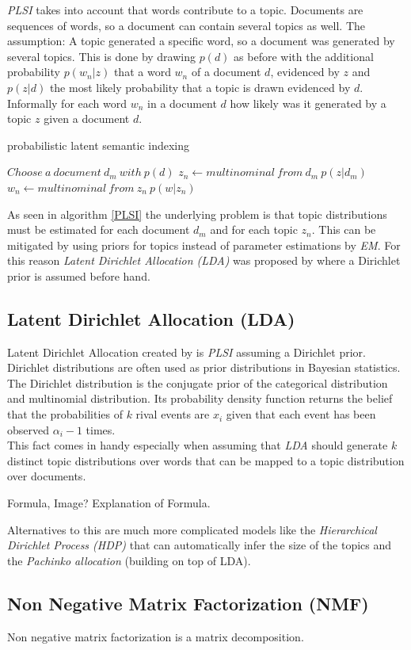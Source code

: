     \emph{PLSI} takes into account that words contribute to a topic. Documents are sequences of words, so a document can contain several topics as well. The assumption: A topic generated a specific word, so a document was generated by several topics. This is done by drawing $p(d)$ as before with the additional probability $p(w_n|z)$ that a word $w_n$ of a document $d$, evidenced by $z$ and $p(z|d)$ the most likely probability that a topic is drawn evidenced by $d$. Informally for each word $w_n$ in a document $d$ how likely was it generated by a topic $z$ given a document $d$.

    \begin{algorithm}[H]
    \begin{algorithmic}[1]
      \caption{probabilistic latent semantic indexing}\label{PLSI}
      \State $Choose\:a\:document\:d_m\:with\:p(d)$
          \State $z_n \gets multinominal\:from\:d_m\:p(z|d_m)$
          \State $w_n \gets multinominal\:from\:z_n\:p(w|z_n)$
        \EndFor
    \end{algorithmic}
    \end{algorithm}

    As seen in algorithm \ref{PLSI} the underlying problem is that topic distributions must be estimated for each document $d_m$ and for each topic $z_n$. This can be mitigated by using priors for topics instead of parameter estimations by \emph{EM}. For this reason \emph{Latent Dirichlet Allocation (LDA)} was proposed by \cite{LDA2003} where a Dirichlet prior is assumed before hand.

  \subsection{Latent Dirichlet Allocation (LDA)}
    Latent Dirichlet Allocation created by \cite{LDA2003} is \emph{PLSI} assuming a Dirichlet prior. Dirichlet distributions are often used as prior distributions in Bayesian statistics. The Dirichlet distribution is the conjugate prior of the categorical distribution and multinomial distribution. Its probability density function returns the belief that the probabilities of $k$ rival events are $x_i$ given that each event has been observed $\alpha_i-1$ times. \cite[Wikipedia quote for Dirichlet processes]{Nothing}\\
    This fact comes in handy especially when assuming that \emph{LDA} should generate $k$ distinct topic distributions over words that can be mapped to a topic distribution over documents. \cite{TopicModelsBlei2012}

    Formula, Image? Explanation of Formula.


    Alternatives to this are much more complicated models like the \emph{Hierarchical Dirichlet Process (HDP)} that can automatically infer the size of the topics and the \emph{Pachinko allocation} (building on top of LDA). \cite{Nothing}
    
  \subsection{Non Negative Matrix Factorization (NMF)}
    Non negative matrix factorization is a matrix decomposition. \cite{NMF1999}


